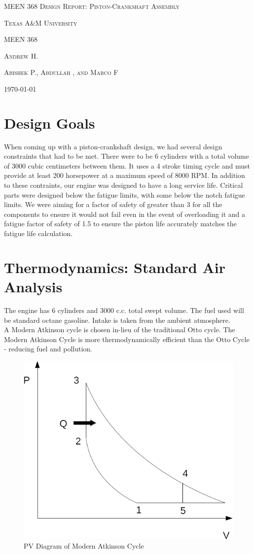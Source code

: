 \documentclass[10pt,a4paper]{article}
\begin{document}
\begin{titlepage}
		\centering
		{\scshape\Huge MEEN 368 Design Report: Piston-Crankshaft Assembly}	
		\vspace{1cm}	
		
		{\scshape\Large Texas A\&M University}
		
		{\scshape \large MEEN 368}
		
		\vspace{3 cm}
		
	{\scshape \normalsize Andrew H.}		
		
		{\scshape \normalsize Abishek P., Abdullah , and Marco F}

		

		\vfill
		
		{\Large \today}
	\end{titlepage}
\section*{Design Goals}
When coming up with a piston-crankshaft design, we had several design constraints that had to be met. There were to be 6 cylinders with 
  a total volume of 3000 cubic centimeters between them. It uses a 4 stroke timing cycle and must provide at least 200 horsepower at a 
  maximum speed of 8000 RPM. In addition to these contraints, our engine was designed to have a long service life. Critical parts were designed below the fatigue limits, with some below the notch fatigue limits.
 We were aiming for a factor of safety of greater than 3 for all the components to ensure it would not fail even in the
  event of overloading it and a fatigue factor of safety of 1.5 to ensure the piston life accurately matches the fatigue life calculation. 
\newpage
\section*{Thermodynamics: Standard Air Analysis}

The engine has 6 cylinders and 3000 c.c. total swept volume. The fuel used will be standard octane gasoline. Intake is taken from the ambient atmosphere.\\
	A Modern Atkinson cycle is chosen in-lieu of the traditional Otto cycle. The Modern Atkinson Cycle is more thermodynamically efficient than the Otto Cycle - reducing fuel and pollution.
	\begin{figure}[h]
		\centering
		\includegraphics[width=.5\textwidth]{ThermoDiagram.png}
		\caption{PV Diagram of Modern Atkinson Cycle}
		\label{fig:diagram1}
	\end{figure}
	
\end{document}

